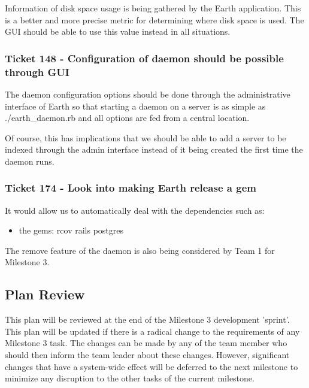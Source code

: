 \documentclass[10pt,a4,oneside]{article}
\begin{document}
\noindent Information of disk space usage is being gathered by the Earth application.
This is a better and more precise metric for determining where disk space 
is used. The GUI should be able to use this value instead in all situations. 

\subsubsection*{Ticket 148 - Configuration of daemon should be possible through GUI}

\noindent The daemon configuration options should be done through the 
administrative interface of Earth so that starting a daemon on a server 
is as simple as ./earth\_daemon.rb and all options are fed from a central 
location.

\noindent Of course, this has implications that we should be able to add 
a server to be indexed through the admin interface instead of it being 
created the first time the daemon runs. 


\subsubsection*{ Ticket 174 - Look into making Earth release a gem}

\noindent It would allow us to automatically deal with the dependencies such as:

\begin{itemize}
\item the gems:
  \subitem rcov
  \subitem rails
  \subitem postgres 
\end{itemize}
 
\noindent The remove feature of the daemon is also being considered by Team 1 for Milestone 3. 

 
\subsection{Plan Review}
 
\noindent This plan will be reviewed at the end of the Milestone 3 development 'sprint'. This plan 
will be updated if there is a radical change to the requirements of any Milestone 3 task. 
The changes can be made by any of the team member who should then inform the team leader 
about these changes. However, significant changes that have a system-wide effect will be deferred 
to the next milestone to minimize any disruption to the other tasks of the current milestone.

\newpage
\end{document}
